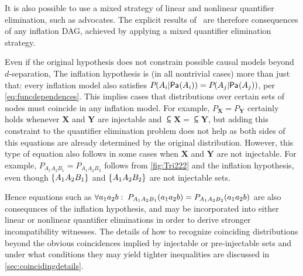 It is also possible to use a mixed strategy of linear and nonlinear quantifier elimination, such as \citet{ChavesPolynomial} advocates. The explicit results of~\cite{ChavesPolynomial} are therefore consequences of any inflation DAG, achieved by applying a mixed quantifier elimination strategy. 


Even if the original hypothesis does not constrain possible causal models beyond $d$-separation, The inflation hypothesis is (in all nontrivial cases) more than just that: every inflation model also satisfies $\pdf{A_i| \Pa{A_i}}=\pdf{A_j|\Pa{A_j}}$, per \cref{eq:funcdependences}.
This implies cases that distributions over certain sets of nodes must coincide in any inflation model. For example, $P_{\bm{X}} = P_{\bm{Y}}$ certainly holds whenever $\bm{X}$ and $\bm{Y}$ are injectable and $\subsim{\bm{X}} = \subsim{\bm{Y}}$, but adding this constraint to the quantifier elimination problem does not help as both sides of this equations are already determined by the original distribution. However, this type of equation also follows in some cases when $\bm{X}$ and $\bm{Y}$ are not injectable. For example, $P_{A_1 A_2 B_1}=P_{A_1 A_2 B_2}$ follows from \cref{fig:Tri222} and the inflation hypothesis, even though $\brackets{A_1 A_2 B_1}$ and $\brackets{A_1 A_2 B_2}$ are not injectable sets.

Hence equations such as $\forall{a_1 a_2 b}:\;\p[A_1 A_2 B_1]{a_1 a_2 b} = \p[A_1 A_2 B_2]{a_1 a_2 b}$ are also consequnces of the inflation hypothesis, and may be incorporated into either linear or nonlinear quantifier eliminations in order to derive stronger incompatibility witnesses. The details of how to recognize coinciding distributions beyond the obvious coincidences implied by injectable or pre-injectable sets and under what conditions they may yield tighter inequalities are discussed in \cref{sec:coincidingdetails}.



